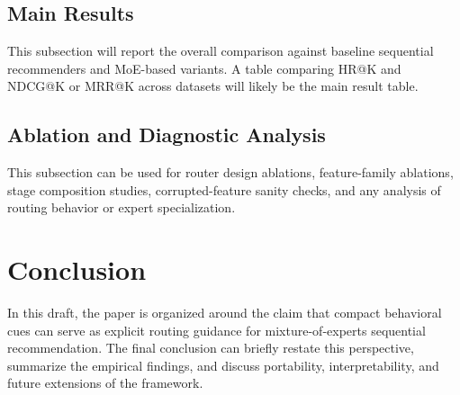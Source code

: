 \documentclass[sigconf,authordraft]{acmart}
\begin{document}
\subsection{Main Results}
This subsection will report the overall comparison against baseline sequential recommenders and MoE-based variants. A table comparing HR@K and NDCG@K or MRR@K across datasets will likely be the main result table.

\subsection{Ablation and Diagnostic Analysis}
This subsection can be used for router design ablations, feature-family ablations, stage composition studies, corrupted-feature sanity checks, and any analysis of routing behavior or expert specialization.

\section{Conclusion}
\label{sec:conclusion}
In this draft, the paper is organized around the claim that compact behavioral cues can serve as explicit routing guidance for mixture-of-experts sequential recommendation. The final conclusion can briefly restate this perspective, summarize the empirical findings, and discuss portability, interpretability, and future extensions of the framework.

% 
% 
\end{document}

